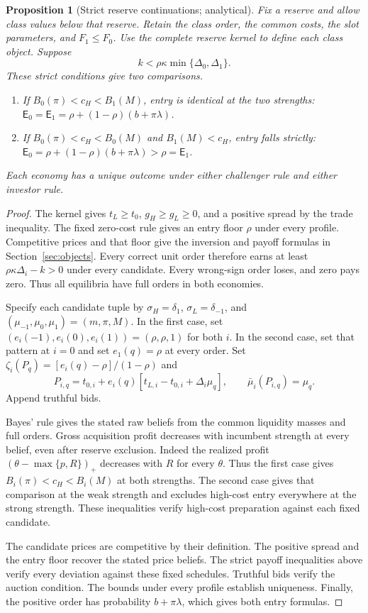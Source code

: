 \documentclass[12pt]{article}
\newtheorem{proposition}{Proposition}
\begin{document}
\begin{proposition}[Strict reserve continuations; analytical]\label{prop:general-reserve}
Fix a reserve and allow class values below that reserve.
Retain the class order, the common costs, the slot parameters, and $F_1\le F_0$.
Use the complete reserve kernel to define each class object.
Suppose
\[
 k<\rho\kappa\min\{\Delta_0,\Delta_1\}.
\]
These strict conditions give two comparisons.
\begin{enumerate}
\item If $B_0(\pi)<c_H<B_1(M)$, entry is identical at the two strengths:
$\mathsf E_0=\mathsf E_1=\rho+(1-\rho)(b+\pi\lambda)$.
\item If $B_0(\pi)<c_H<B_0(M)$ and $B_1(M)<c_H$, entry falls strictly:
$\mathsf E_0=\rho+(1-\rho)(b+\pi\lambda)>\rho=\mathsf E_1$.
\end{enumerate}
Each economy has a unique outcome under either challenger rule and either investor rule.
\end{proposition}

\begin{proof}
The kernel gives $t_L\ge t_0$, $g_H\ge g_L\ge0$, and a positive spread by the trade inequality.
The fixed zero-cost rule gives an entry floor $\rho$ under every profile.
Competitive prices and that floor give the inversion and payoff formulas in Section~\ref{sec:objects}.
Every correct unit order therefore earns at least $\rho\kappa\Delta_i-k>0$ under every candidate.
Every wrong-sign order loses, and zero pays zero.
Thus all equilibria have full orders in both economies.

Specify each candidate tuple by $\sigma_H=\delta_1$, $\sigma_L=\delta_{-1}$, and $(\mu_{-1},\mu_0,\mu_1)=(m,\pi,M)$.
In the first case, set $(e_i(-1),e_i(0),e_i(1))=(\rho,\rho,1)$ for both $i$.
In the second case, set that pattern at $i=0$ and set $e_1(q)=\rho$ at every order.
Set $\zeta_i(P_q)=[e_i(q)-\rho]/(1-\rho)$ and
\[
 P_{i,q}=t_{0,i}+e_i(q)[t_{L,i}-t_{0,i}+\Delta_i\mu_q],\qquad
 \bar\mu_i(P_{i,q})=\mu_q.
\]
Append truthful bids.

Bayes' rule gives the stated raw beliefs from the common liquidity masses and full orders.
Gross acquisition profit decreases with incumbent strength at every belief, even after reserve exclusion.
Indeed the realized profit $(\theta-\max\{p,R\})_+$ decreases with $R$ for every $\theta$.
Thus the first case gives $B_i(\pi)<c_H<B_i(M)$ at both strengths.
The second case gives that comparison at the weak strength and excludes high-cost entry everywhere at the strong strength.
These inequalities verify high-cost preparation against each fixed candidate.

The candidate prices are competitive by their definition.
The positive spread and the entry floor recover the stated price beliefs.
The strict payoff inequalities above verify every deviation against these fixed schedules.
Truthful bids verify the auction condition.
The bounds under every profile establish uniqueness.
Finally, the positive order has probability $b+\pi\lambda$, which gives both entry formulas.
\end{proof}
\end{document}
